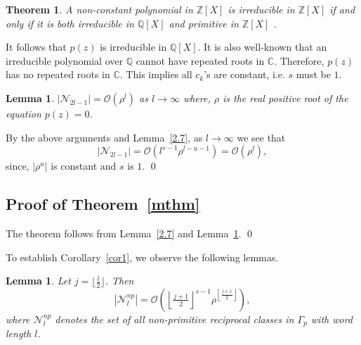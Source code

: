 \documentclass[11pt]{amsart}
\renewenvironment{proof}{{\bfseries Proof.}}{\qed}
\numberwithin{equation}{section}
\newtheorem{lemma}[theorem]{Lemma}
\newtheorem{thm}[theorem]{Theorem}
\theoremstyle{definition}
\newcommand{\thmref}[1]{Theorem~\ref{#1}}
\newcommand{\lemref}[1]{Lemma~\ref{#1}}
\newcommand{\corref}[1]{Corollary~\ref{#1}}
\numberwithin{equation}{section}
\begin{document}
		\begin{thm}
			A non-constant polynomial in $ \mathbb{Z}[\textit{X}]$ is irreducible in $\mathbb{Z}[\textit{X}]$ if and only if it is both irreducible in $\mathbb{Q}[\textit{X}]$ and primitive in $\mathbb{Z}[\textit{X}]$ .
		\end{thm}
		It follows that $p(z)$ is irreducible in $\mathbb{Q}[X].$ It is also well-known that an irreducible polynomial over $\mathbb{Q}$ cannot have repeated roots in $\mathbb{C}$.  
		Therefore, $p(z)$ has no repeated roots in $\mathbb{C}$. This implies all $c_k$'s are constant, i.e. $s$ must be $1$. 
		
		\begin{lemma}\label{5} $|\mathcal{N}_{2l-1}|=\mathcal{O} (\rho^{l})$ as $l\rightarrow \infty$ where, $ \rho $ is the real positive root of the equation $p(z)=0$. 
		\end{lemma}
		\begin{proof}
			By the above arguments and  \lemref{2.7}, as $l\rightarrow \infty$ we see that $$|\mathcal{N}_{2l-1}|=\mathcal{O} (l^{s-1}\rho^{l-u-1})=\mathcal{O}(\rho^{l}),$$ since, $|\rho^{u}|$ is constant and $s$ is $1$.
		\end{proof}
		
		\subsection*{Proof of \thmref{mthm}} 
		The theorem follows from \lemref{2.7} and \lemref{5}. \qed
		\medskip

To establish \corref{cor1}, we observe the following lemmas. 
	\begin{lemma}
		Let $j = \lfloor \tfrac{l}{2} \rfloor$. Then
		\[
		|\mathcal{N}^{np}_{l}| = \mathcal{O}\left(\left\lfloor \tfrac{j+1}{2} \right\rfloor^{s-1} \rho^{\left\lfloor \tfrac{j+1}{2} \right\rfloor} \right),
		\]
		where $\mathcal{N}^{np}_{l}$ denotes the set of all non-primitive reciprocal classes in $\Gamma_p$ with word length $l$.
	\end{lemma}
	
\end{document}
